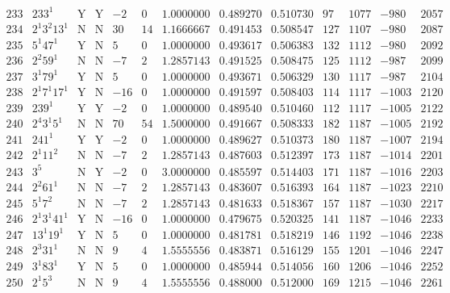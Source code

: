 \documentclass[11pt,reqno,a4letter]{article}
\numberwithin{equation}{section}
\numberwithin{figure}{section}
\numberwithin{table}{section}
\theoremstyle{plain}
\numberwithin{theorem}{section}
\theoremstyle{definition}
\begin{document}
\begin{table}[ht]
\begin{equation*}
{\begin{array}{cc|cc|ccc|cc|cccc}
 233 & 233^1 & \text{Y} & \text{Y} & -2 & 0 & 1.0000000 & 0.489270 & 0.510730 & 97 & 1077 & -980 & 2057 \\
 234 & 2^1 3^2 13^1 & \text{N} & \text{N} & 30 & 14 & 1.1666667 & 0.491453 & 0.508547 & 127 & 1107 & -980 & 2087 \\
 235 & 5^1 47^1 & \text{Y} & \text{N} & 5 & 0 & 1.0000000 & 0.493617 & 0.506383 & 132 & 1112 & -980 & 2092 \\
 236 & 2^2 59^1 & \text{N} & \text{N} & -7 & 2 & 1.2857143 & 0.491525 & 0.508475 & 125 & 1112 & -987 & 2099 \\
 237 & 3^1 79^1 & \text{Y} & \text{N} & 5 & 0 & 1.0000000 & 0.493671 & 0.506329 & 130 & 1117 & -987 & 2104 \\
 238 & 2^1 7^1 17^1 & \text{Y} & \text{N} & -16 & 0 & 1.0000000 & 0.491597 & 0.508403 & 114 & 1117 & -1003 & 2120 \\
 239 & 239^1 & \text{Y} & \text{Y} & -2 & 0 & 1.0000000 & 0.489540 & 0.510460 & 112 & 1117 & -1005 & 2122 \\
 240 & 2^4 3^1 5^1 & \text{N} & \text{N} & 70 & 54 & 1.5000000 & 0.491667 & 0.508333 & 182 & 1187 & -1005 & 2192 \\
 241 & 241^1 & \text{Y} & \text{Y} & -2 & 0 & 1.0000000 & 0.489627 & 0.510373 & 180 & 1187 & -1007 & 2194 \\
 242 & 2^1 11^2 & \text{N} & \text{N} & -7 & 2 & 1.2857143 & 0.487603 & 0.512397 & 173 & 1187 & -1014 & 2201 \\
 243 & 3^5 & \text{N} & \text{Y} & -2 & 0 & 3.0000000 & 0.485597 & 0.514403 & 171 & 1187 & -1016 & 2203 \\
 244 & 2^2 61^1 & \text{N} & \text{N} & -7 & 2 & 1.2857143 & 0.483607 & 0.516393 & 164 & 1187 & -1023 & 2210 \\
 245 & 5^1 7^2 & \text{N} & \text{N} & -7 & 2 & 1.2857143 & 0.481633 & 0.518367 & 157 & 1187 & -1030 & 2217 \\
 246 & 2^1 3^1 41^1 & \text{Y} & \text{N} & -16 & 0 & 1.0000000 & 0.479675 & 0.520325 & 141 & 1187 & -1046 & 2233 \\
 247 & 13^1 19^1 & \text{Y} & \text{N} & 5 & 0 & 1.0000000 & 0.481781 & 0.518219 & 146 & 1192 & -1046 & 2238 \\
 248 & 2^3 31^1 & \text{N} & \text{N} & 9 & 4 & 1.5555556 & 0.483871 & 0.516129 & 155 & 1201 & -1046 & 2247 \\
 249 & 3^1 83^1 & \text{Y} & \text{N} & 5 & 0 & 1.0000000 & 0.485944 & 0.514056 & 160 & 1206 & -1046 & 2252 \\
 250 & 2^1 5^3 & \text{N} & \text{N} & 9 & 4 & 1.5555556 & 0.488000 & 0.512000 & 169 & 1215 & -1046 & 2261 \\

\end{array}}
\end{equation*}
\end{table}
\end{document}
